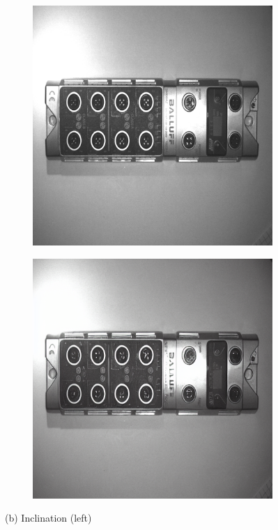 \documentclass[12pt,DIV14,BCOR12mm,a4paper,footinclude=false,headinclude,parskip=half-,twoside,openright,cleardoublepage=empty,toc=index,bibliography=totoc,listof=totoc]{scrreprt}
\numberwithin{equation}{chapter}
\begin{document}
\begin{figure}
    \begin{subfigure}[t]{0.45\textwidth}
        \centering
        \includegraphics[width=\textwidth]{../media/diff_bni_left_real.png}
    \end{subfigure}%
    \hspace{0.02\textwidth}%
    \begin{subfigure}[t]{0.45\textwidth}
        \centering
        \includegraphics[width=\textwidth]{../media/diff_bni_left_fake.png}
    \end{subfigure}
    \caption*{(b) Inclination (left)}


\end{figure}
\end{document}
